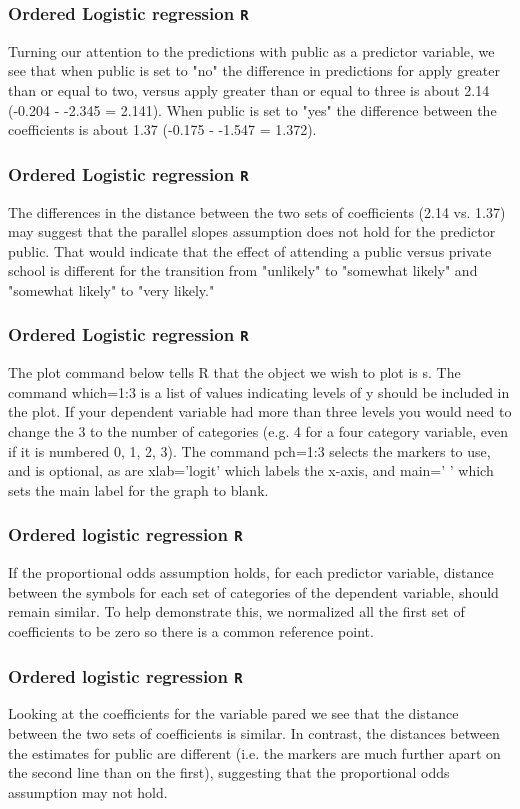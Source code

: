 \documentclass[00-GLMregslides.tex]{subfiles}
\begin{document}
	\begin{frame}[fragile]
		\frametitle{Ordered Logistic regression \texttt{R} }
		\Large
		Turning our attention to the predictions with public as a predictor variable, we see that when public is set to "no" the difference in predictions for apply greater than or equal to two, versus apply greater than or equal to three is about 2.14 (-0.204 - -2.345 = 2.141). When public is set to "yes" the difference between the coefficients is about 1.37 (-0.175 - -1.547 = 1.372).
	\end{frame}
	
	\begin{frame}[fragile]
		\frametitle{Ordered Logistic regression \texttt{R} }
		\Large
		The differences in the distance between the two sets of coefficients (2.14 vs. 1.37) may suggest that the parallel slopes assumption does not hold for the predictor public. That would indicate that the effect of attending a public versus private school is different for the transition from "unlikely" to "somewhat likely" and "somewhat likely" to "very likely."
	\end{frame}
	\begin{frame}[fragile]
		\frametitle{Ordered Logistic regression \texttt{R} }
		\Large
		The plot command below tells R that the object we wish to plot is s. The command which=1:3 is a list of values indicating levels of y should be included in the plot. If your dependent variable had more than three levels you would need to change the 3 to the number of categories (e.g. 4 for a four category variable, even if it is numbered 0, 1, 2, 3). The command pch=1:3 selects the markers to use, and is optional, as are xlab='logit' which labels the x-axis, and main=' ' which sets the main label for the graph to blank. 
	\end{frame}
	
	\begin{frame}[fragile]
		\frametitle{Ordered logistic regression \texttt{R} }
		\Large
		If the proportional odds assumption holds, for each predictor variable, distance between the symbols for each set of categories of the dependent variable, should remain similar. To help demonstrate this, we normalized all the first set of coefficients to be zero so there is a common reference point.
		
	\end{frame}
	
	\begin{frame}[fragile]
		\frametitle{Ordered logistic regression \texttt{R} }
		\Large
		Looking at the coefficients for the variable pared we see that the distance between the two sets of coefficients is similar. In contrast, the distances between the estimates for public are different (i.e. the markers are much further apart on the second line than on the first), suggesting that the proportional odds assumption may not hold.
	\end{frame}
\end{document}
